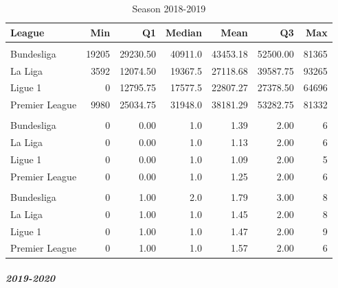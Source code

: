 \documentclass[
]{article}
\begin{document}
\begin{table}

\caption{\label{tab:unnamed-chunk-12}Season 2018-2019}
\centering
\begin{tabular}[t]{lrrrrrr}
\toprule
League & Min & Q1 & Median & Mean & Q3 & Max\\
\midrule
\addlinespace[0.3em]
\multicolumn{7}{l}{\textbf{Attendance}}\\
\hspace{1em}Bundesliga & 19205 & 29230.50 & 40911.0 & 43453.18 & 52500.00 & 81365\\
\hspace{1em}La Liga & 3592 & 12074.50 & 19367.5 & 27118.68 & 39587.75 & 93265\\
\hspace{1em}Ligue 1 & 0 & 12795.75 & 17577.5 & 22807.27 & 27378.50 & 64696\\
\hspace{1em}Premier League & 9980 & 25034.75 & 31948.0 & 38181.29 & 53282.75 & 81332\\
\addlinespace[0.3em]
\multicolumn{7}{l}{\textbf{Goals away}}\\
\hspace{1em}Bundesliga & 0 & 0.00 & 1.0 & 1.39 & 2.00 & 6\\
\hspace{1em}La Liga & 0 & 0.00 & 1.0 & 1.13 & 2.00 & 6\\
\hspace{1em}Ligue 1 & 0 & 0.00 & 1.0 & 1.09 & 2.00 & 5\\
\hspace{1em}Premier League & 0 & 0.00 & 1.0 & 1.25 & 2.00 & 6\\
\addlinespace[0.3em]
\multicolumn{7}{l}{\textbf{Goals home}}\\
\hspace{1em}Bundesliga & 0 & 1.00 & 2.0 & 1.79 & 3.00 & 8\\
\hspace{1em}La Liga & 0 & 1.00 & 1.0 & 1.45 & 2.00 & 8\\
\hspace{1em}Ligue 1 & 0 & 1.00 & 1.0 & 1.47 & 2.00 & 9\\
\hspace{1em}Premier League & 0 & 1.00 & 1.0 & 1.57 & 2.00 & 6\\
\bottomrule
\end{tabular}
\end{table}

\hypertarget{section-2}{%
\subparagraph{2019-2020}\label{section-2}}
\end{document}
